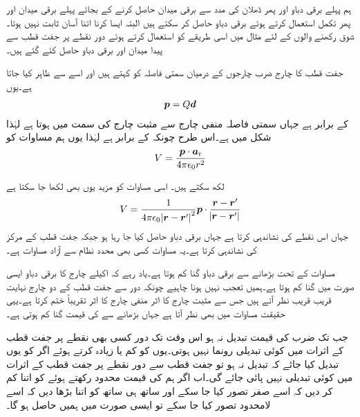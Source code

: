 ہم پہلے برقی دباو اور پھر ڈھلان کی مدد سے برقی میدان حاصل کرنے کے بجائے پہلے برقی میدان اور پھر تکمل استعمال کرتے ہوئے برقی دباو حاصل کر سکتے ہیں البتہ ایسا کرنا اتنا آسان ثابت نہیں ہوتا۔شوق رکھنے والوں کے لئے مثال  میں اسی طریقے کو استعمال کرتے ہوئے دور نقطے پر جفت قطب  سے پیدا میدان اور برقی دباو حاصل کئے گئے ہیں۔

جفت قطب کا چارج  ضرب چارجوں کے درمیان سمتی فاصلہ  کو   کہتے ہیں اور اسے  سے ظاہر کیا جاتا ہے۔یوں 
\begin{align}\label{مساوات_توانائی_سمتی_جفت_قطب}
{\ensuremath{{\boldsymbol{p}}}}=Q {{\boldsymbol{d}}}
\end{align}
کے برابر ہے جہاں سمتی فاصلہ منفی چارج سے مثبت چارج کی سمت میں ہوتا ہے لہٰذا شکل  میں  ہے۔اس طرح چونکہ  کے برابر ہے لہٰذا یوں ہم مساوات  کو
\begin{align}
V=\frac{{{\boldsymbol{p}}} \cdot {\boldsymbol{a}}_{\textup{r}}}{4 \pi \epsilon_0 r^2}
\end{align} 

لکھ سکتے ہیں۔ اسی مساوات کو مزید یوں بھی لکھا جا سکتا ہے
\begin{align}
V=\frac{1}{4\pi \epsilon_0 \abs{{{\boldsymbol{r}}}-{{\boldsymbol{r}}}'}^2} {{\boldsymbol{p}}} \cdot \frac{{{\boldsymbol{r}}}-{{\boldsymbol{r}}}'}{\abs{{{\boldsymbol{r}}}-{{\boldsymbol{r}}}'}}
\end{align}
جہاں  اس نقطے کی نشاندہی کرتا ہے جہاں برقی دباو حاصل کیا جا رہا ہو جبکہ  جفت قطب کے مرکز کی نشاندہی کرتا ہے۔یہ مساوات کسی بھی محدد نظام سے آزاد مساوات ہے۔

مساوات  کے تحت  بڑھانے سے  برقی دباو  گنا کم ہوتا ہے۔یاد رہے کہ اکیلے چارج کا برقی دباو ایسی صورت میں  گنا کم ہوتا ہے۔ہمیں تعجب نہیں ہونا چاہیے چونکہ دور سے جفت قطب کے دو چارج نہایت قریب قریب نظر آتے ہیں جس سے مثبت چارج کا اثر منفی چارج کا اثر تقریباً ختم کرتا ہے۔یہی حقیقت مساوات  میں بھی نظر آتا ہے جہاں  بڑھانے سے   کی قیمت  گنا کم ہوتی ہے۔

جب تک  ضرب  کی قیمت تبدیل نہ ہو اس وقت تک دور کسی بھی نقطے پر جفت قطب کے اثرات میں کوئی تبدیلی رونما نہیں ہوتی۔یوں  کو کم  یا زیادہ کرتے ہوئے اگر  کو یوں تبدیل کیا جائے کہ  تبدیل نہ ہو تو جفت قطب سے دور نقطے پر جفت قطب کے اثرات میں کوئی تبدیلی نہیں پائی جائے گی۔اب اگر  ہم  کی قیمت محدود رکھتے ہوئے   کو اتنا کم کر دیں کہ اسے صفر تصور  کیا جا سکے  اور ساتھ ہی ساتھ  کو اتنا بڑھا دیں کہ اسے لامحدود تصور کیا جا سکے  تو ایسی صورت میں ہمیں  حاصل ہو گا۔


